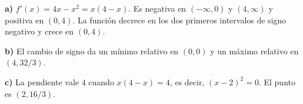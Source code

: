 \textbf{a)} $f'(x)=4x-x^2=x(4-x)$. Es negativa en $(-\infty,0)$ y $(4,\infty)$ y positiva en $(0,4)$. La función decrece en los dos primeros intervalos de signo negativo y crece en $(0,4)$.

\textbf{b)} El cambio de signo da un mínimo relativo en $(0,0)$ y un máximo relativo en $(4,32/3)$.

\textbf{c)} La pendiente vale $4$ cuando $x(4-x)=4$, es decir, $(x-2)^2=0$. El punto es $\boxed{(2,16/3)}$.
